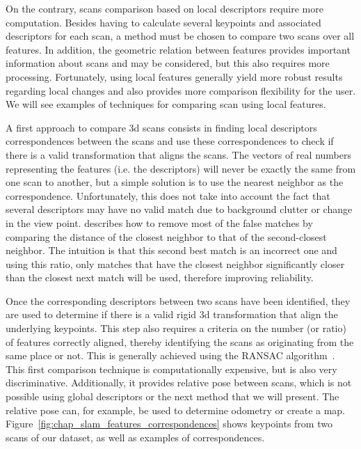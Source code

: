 On the contrary, scans comparison based on local descriptors require more computation. Besides having to calculate several keypoints and associated descriptors for each scan, a method must be chosen to compare two scans over all features. In addition, the geometric relation between features provides important information about scans and may be considered, but this also requires more processing. Fortunately, using local features generally yield more robust results regarding local changes and also provides more comparison flexibility for the user. We will see examples of techniques for comparing scan using local features.

A first approach to compare \gls*{3d} scans consists in finding local descriptors correspondences between the scans and use these correspondences to check if there is a valid transformation that aligns the scans. The vectors of real numbers representing the features (i.e. the descriptors) will never be exactly the same from one scan to another, but a simple solution is to use the nearest neighbor as the correspondence. Unfortunately, this does not take into account the fact that several descriptors may have no valid match due to background clutter or change in the view point. \cite[Section 7.1]{Lowe2004} describes how to remove most of the false matches by comparing the distance of the closest neighbor to that of the second-closest neighbor. The intuition is that this second best match is an incorrect one and using this ratio, only matches that have the closest neighbor significantly closer than the closest next match will be used, therefore improving reliability.

Once the corresponding descriptors between two scans have been identified, they are used to determine if there is a valid rigid \gls*{3d} transformation that align the underlying keypoints. This step also requires a criteria on the number (or ratio) of features correctly aligned, thereby identifying the scans as originating from the same place or not. This is generally achieved using the RANSAC algorithm~\cite{Fischler1981}. This first comparison technique is computationally expensive, but is also very discriminative. Additionally, it provides relative pose between scans, which is not possible using global descriptors or the next method that we will present. The relative pose can, for example, be used to determine odometry or create a map. Figure~\ref{fig:chap_slam_features_correspondences} shows keypoints from two scans of our dataset, as well as examples of correspondences.

